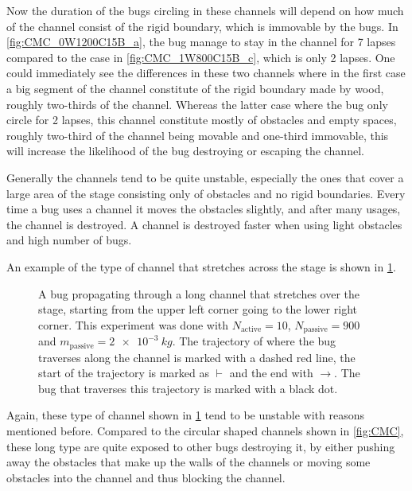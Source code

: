 Now the duration of the bugs circling in these channels will 
depend on how much of the channel consist of the rigid boundary, 
which is immovable by the bugs. In \cref{fig:CMC_0W1200C15B_a}, 
the bug manage to stay in the channel for 7 lapses compared to 
the case in \cref{fig:CMC_1W800C15B_c}, which is only 2 lapses. 
One could immediately see the differences in these two channels 
where in the first case a big segment of the channel constitute 
of the rigid boundary made by wood, roughly two-thirds of the channel. 
Whereas the latter case where the bug only circle for 2 lapses, 
this channel constitute mostly of obstacles and empty spaces, 
roughly two-third of the channel being movable and one-third immovable, 
this will increase the likelihood of the bug destroying or escaping the channel. 

Generally the channels tend to be quite unstable, especially the ones 
that cover a large area of the stage consisting only of obstacles and 
no rigid boundaries. Every time a bug uses a channel it moves 
the obstacles slightly, and after many usages, the channel is destroyed. 
A channel is destroyed faster when using light obstacles and high number of bugs.

An example of the type of channel that stretches across the stage 
is shown in \cref{fig:CM_0W900C10B}.

\begin{figure}[htpb!]
\centering
{}
\caption{A bug propagating through a long channel that stretches over the stage, 
starting from the upper left corner going to the lower right corner.
This experiment was done with $N_{\text{active}}=10$, $N_{\text{passive}}=900$ and 
$m_{\text{passive}}=\SI{2e-3}{kg}$. The trajectory of where the bug traverses along the 
channel is marked with a dashed red line, the start of the trajectory is marked as $\vdash$ and the 
end with $\rightarrow$. The bug that traverses this trajectory is marked with a black dot.} 
\label{fig:CM_0W900C10B}
\end{figure}

Again, these type of channel shown in \cref{fig:CM_0W900C10B} 
tend to be unstable with reasons mentioned before. 
Compared to the circular shaped channels shown in \cref{fig:CMC}, these long type 
are quite exposed to other bugs destroying it, by either pushing away 
the obstacles that make up the walls of the channels or moving some 
obstacles into the channel and thus blocking the channel. 

